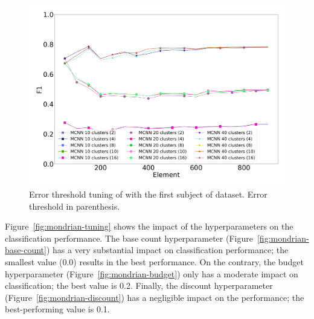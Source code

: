 \begin{figure}
		\center
  \includegraphics[width=0.8\linewidth]{figures/calibration_mcnn.png}
	\caption{Error threshold tuning of \mcnn with the first subject of
		\banosdataset dataset. Error threshold in parenthesis.}
	\label{fig:mcnn-tuning-error}
\end{figure}

Figure~\ref{fig:mondrian-tuning} shows the impact of the \mondrianforest hyperparameters on
the classification performance. 
The base count hyperparameter (Figure~\ref{fig:mondrian-base-count}) has a
very substantial impact on classification performance; the smallest value
(0.0) results in the best performance. On the contrary, the
budget hyperparameter (Figure~\ref{fig:mondrian-budget}) only has a
moderate impact on classification; the best value is 0.2. Finally, the discount hyperparameter
(Figure~\ref{fig:mondrian-discount}) has a negligible impact on the
performance; the best-performing value is 0.1.

